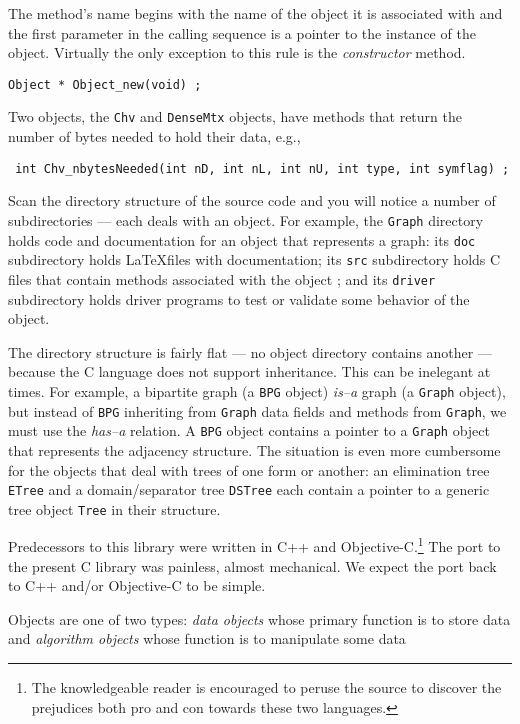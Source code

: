 The method's name begins with the name of the object it is
associated with and the first parameter in the calling sequence is
a pointer to the instance of the object. 
Virtually the only exception to this rule is the {\it constructor} 
method.

\centerline{\tt Object * Object\_new(void) ;}

\noindent 
Two objects, the {\tt Chv} and {\tt DenseMtx} objects, have
methods that return the number of bytes needed to hold their data,
e.g.,

\centerline{\tt 
int Chv\_nbytesNeeded(int nD, int nL, int nU, int type, int symflag) ;}
\par
Scan the directory structure of the source code and you will notice
a number of subdirectories --- each deals with an object.
For example, 
the {\tt Graph} directory holds code and documentation for an
object that represents a graph:
its {\tt doc} subdirectory holds \LaTeX files with documentation;
its {\tt src} subdirectory holds C files that contain methods
associated with the object ;
and its {\tt driver} subdirectory holds driver programs to test or
validate some behavior of the object.
\par
The directory structure is fairly flat --- no object directory
contains another --- because the C language does not support
inheritance.
This can be inelegant at times.
For example, a bipartite graph (a {\tt BPG} object) 
{\it is--a} graph (a {\tt Graph} object), but instead of {\tt BPG}
inheriting from {\tt Graph} data fields and methods from {\tt Graph},
we must use the {\it has--a} relation.
A {\tt BPG} object contains a pointer to a {\tt Graph} object
that represents the adjacency structure.
The situation is even more cumbersome for the objects that deal
with trees of one form or another: an elimination tree {\tt ETree}
and a domain/separator tree {\tt DSTree} each contain a pointer to
a generic tree object {\tt Tree} in their structure.
\par
Predecessors to this library were written in C++ and 
Objective-C.\footnote{The knowledgeable reader is encouraged to
peruse the source to discover the prejudices both pro and con
towards these two languages.}
The port to the present C library was painless, almost mechanical.
We expect the port back to C++ and/or Objective-C to be simple.
\par
Objects are one of two types: 
{\it data objects} whose primary function is to store data
and
{\it algorithm objects} whose function is to manipulate some data
